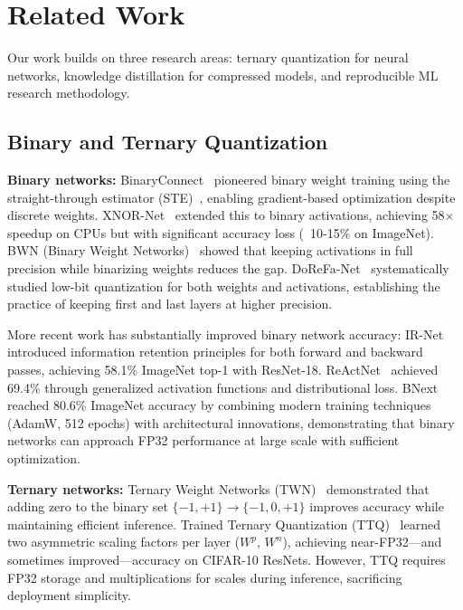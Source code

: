 
\section{Related Work}
\label{sec:related_work}

Our work builds on three research areas: ternary quantization for neural networks, knowledge distillation for compressed models, and reproducible ML research methodology.

\subsection{Binary and Ternary Quantization}

\textbf{Binary networks:} BinaryConnect~\cite{courbariaux2015binaryconnect} pioneered binary weight training using the straight-through estimator (STE)~\cite{bengio2013estimating}, enabling gradient-based optimization despite discrete weights. XNOR-Net~\cite{rastegari2016xnornet} extended this to binary activations, achieving 58× speedup on CPUs but with significant accuracy loss (~10-15\% on ImageNet). BWN (Binary Weight Networks)~\cite{rastegari2016xnornet} showed that keeping activations in full precision while binarizing weights reduces the gap. DoReFa-Net~\cite{zhou2016dorefa} systematically studied low-bit quantization for both weights and activations, establishing the practice of keeping first and last layers at higher precision.

More recent work has substantially improved binary network accuracy: IR-Net~\cite{qin2020irnet} introduced information retention principles for both forward and backward passes, achieving 58.1\% ImageNet top-1 with ResNet-18. ReActNet~\cite{liu2020reactnet} achieved 69.4\% through generalized activation functions and distributional loss. BNext~\cite{guo2022bnext} reached 80.6\% ImageNet accuracy by combining modern training techniques (AdamW, 512 epochs) with architectural innovations, demonstrating that binary networks can approach FP32 performance at large scale with sufficient optimization.

\textbf{Ternary networks:} Ternary Weight Networks (TWN)~\cite{li2016ternary} demonstrated that adding zero to the binary set $\{-1,+1\} \to \{-1,0,+1\}$ improves accuracy while maintaining efficient inference. Trained Ternary Quantization (TTQ)~\cite{zhu2017ttq} learned two asymmetric scaling factors per layer ($W^p$, $W^n$), achieving near-FP32—and sometimes improved—accuracy on CIFAR-10 ResNets. However, TTQ requires FP32 storage and multiplications for scales during inference, sacrificing deployment simplicity.

